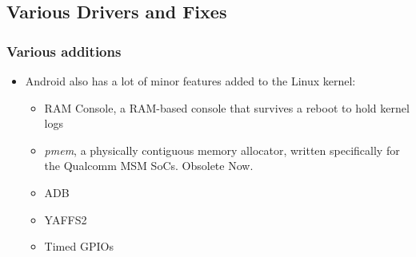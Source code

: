 \subsection{Various Drivers and Fixes}
\begin{frame}
  \frametitle{Various additions}
  \begin{itemize}
  \item Android also has a lot of minor features added to the Linux
    kernel:
    \begin{itemize}
    \item RAM Console, a RAM-based console that survives a reboot to
      hold kernel logs
    \item \textit{pmem}, a physically contiguous memory allocator,
      written specifically for the Qualcomm MSM SoCs. Obsolete Now.
    \item ADB
    \item YAFFS2
    \item Timed GPIOs
    \end{itemize}
  \end{itemize}
\end{frame}
